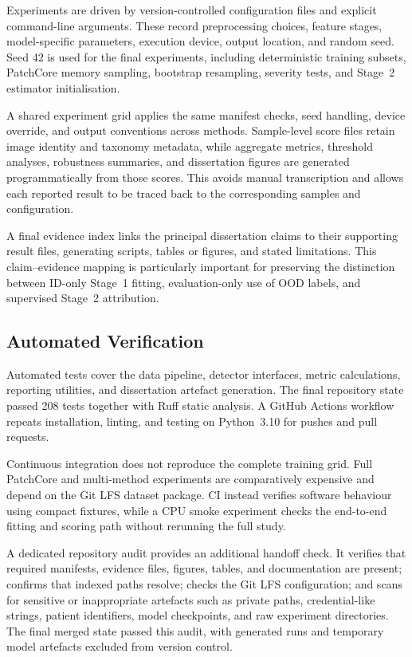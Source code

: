 \documentclass[fleqn,12pt]{olplainarticle}
\begin{document}
Experiments are driven by version-controlled configuration files and explicit
command-line arguments. These record preprocessing choices, feature stages,
model-specific parameters, execution device, output location, and random
seed. Seed 42 is used for the final experiments, including deterministic
training subsets, PatchCore memory sampling, bootstrap resampling, severity
tests, and Stage~2 estimator initialisation.

A shared experiment grid applies the same manifest checks, seed handling,
device override, and output conventions across methods. Sample-level score
files retain image identity and taxonomy metadata, while aggregate metrics,
threshold analyses, robustness summaries, and dissertation figures are
generated programmatically from those scores. This avoids manual
transcription and allows each reported result to be traced back to the
corresponding samples and configuration.

A final evidence index links the principal dissertation claims to their
supporting result files, generating scripts, tables or figures, and stated
limitations. This claim--evidence mapping is particularly important for
preserving the distinction between ID-only Stage~1 fitting, evaluation-only
use of OOD labels, and supervised Stage~2 attribution.

\subsection{Automated Verification}
\label{subsec:reproducibility_verification}

Automated tests cover the data pipeline, detector interfaces, metric
calculations, reporting utilities, and dissertation artefact generation. The
final repository state passed 208 tests together with Ruff static analysis. A
GitHub Actions workflow repeats installation, linting, and testing on
Python~3.10 for pushes and pull requests.

Continuous integration does not reproduce the complete training grid. Full
PatchCore and multi-method experiments are comparatively expensive and depend
on the Git LFS dataset package. CI instead verifies software behaviour using
compact fixtures, while a CPU smoke experiment checks the end-to-end fitting
and scoring path without rerunning the full study.

A dedicated repository audit provides an additional handoff check. It verifies
that required manifests, evidence files, figures, tables, and documentation
are present; confirms that indexed paths resolve; checks the Git LFS
configuration; and scans for sensitive or inappropriate artefacts such as
private paths, credential-like strings, patient identifiers, model
checkpoints, and raw experiment directories. The final merged state passed
this audit, with generated runs and temporary model artefacts excluded from
version control.
\end{document}
